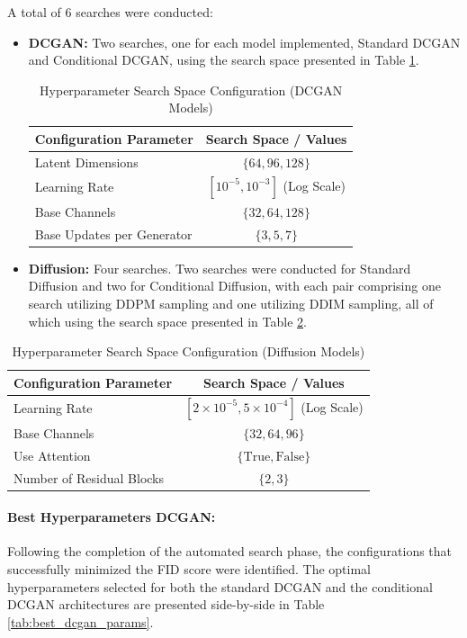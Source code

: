 \documentclass[runningheads]{llncs}
\begin{document}
\noindent
A total of 6 searches were conducted:
\begin{itemize}
    \item \textbf{DCGAN:} Two searches, one for each model implemented, Standard DCGAN and Conditional DCGAN, using the search space presented in Table \ref{tab:hyperparam_search_space}.

\begin{table}[H]
\centering
\caption{Hyperparameter Search Space Configuration (DCGAN Models)}
\label{tab:hyperparam_search_space}
\begin{tabular}{lc}
\hline
\textbf{Configuration Parameter} & \textbf{Search Space / Values} \\
\hline
Latent Dimensions & $\{64, 96, 128\}$ \\
Learning Rate & $[10^{-5}, 10^{-3}]$ (Log Scale) \\
Base Channels & $\{32, 64, 128\}$ \\
Base Updates per Generator & $\{3, 5, 7\}$ \\
\hline
\end{tabular}
\end{table}
 
    \item \textbf{Diffusion:} Four searches. Two searches were conducted for Standard Diffusion and two for Conditional Diffusion, with each pair comprising one search utilizing DDPM sampling and one utilizing DDIM sampling, all of which using the search space presented in Table \ref{tab:diffusion_hyperparam_search_space}.
\end{itemize}


\begin{table}[H]
\centering
\caption{Hyperparameter Search Space Configuration (Diffusion Models)}
\label{tab:diffusion_hyperparam_search_space}
\begin{tabular}{lc}
\hline
\textbf{Configuration Parameter} & \textbf{Search Space / Values} \\
\hline
Learning Rate & $[2 \times 10^{-5}, 5 \times 10^{-4}]$ (Log Scale) \\
Base Channels & $\{32, 64, 96\}$ \\
Use Attention & $\{\text{True}, \text{False}\}$ \\
Number of Residual Blocks & $\{2, 3\}$ \\
\hline
\end{tabular}
\end{table}

\noindent
\paragraph{\normalfont\textbf{Best Hyperparameters DCGAN:}} Following the completion of the automated search phase, the configurations that successfully minimized the FID score were identified. The optimal hyperparameters selected for both the standard DCGAN and the conditional DCGAN architectures are presented side-by-side in Table \ref{tab:best_dcgan_params}.
\end{document}
